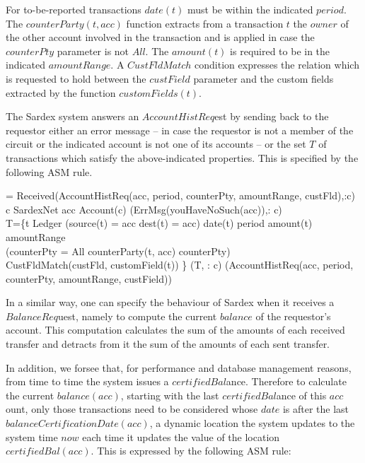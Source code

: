 For to-be-reported transactions $date(t)$ must be within the indicated $period$.  The $counterParty(t, acc)$ function extracts from a transaction $t$ the $owner$ of the other account involved in the transaction and is applied in case the $counterPty$ parameter is not $All$.  The $amount(t)$  is required to be in the indicated $amountRange$. A $CustFldMatch$ condition expresses the relation which is requested to hold between the $custField$ parameter and the custom fields extracted by the function $customFields(t)$. 



The Sardex system answers an $AccountHistReq$est by sending back to the requestor 
either an error message -- in case the requestor is not a member of the circuit or 
the indicated account is not one of its accounts -- or the set $T$ of transactions 
which satisfy the above-indicated properties. This is specified by the following ASM rule.

\begin{asm}
=\+
   \IF Received(AccountHistReq(acc, period, counterPty, amountRange, custFld),\FROM :c)    \THEN \+
     \IF c \not \in SardexNet \OR acc \not\in Account(c) \+
       \THEN {}(ErrMsg(youHaveNoSuch(acc)),\TO : c)\\
       \ELSE \+
       \LET T=\{t \in Ledger \mid (source(t) = acc \OR dest(t) = acc) \+
           \AND date(t) \in period \AND amount(t) \in amountRange \\
           \AND (\IF counterPty \not = All \THEN 
               counterParty(t, acc) \in  counterPty)\\
           \AND CustFldMatch(custFld, customField(t)) \} \IN \+
                 (T, \TO : c)\dec\dec\dec\-
     (AccountHistReq(acc, period, counterPty, amountRange, custField))
\end{asm}

In a similar way, one can specify the behaviour of Sardex when it receives a $BalanceReq$uest, namely to compute the current $balance$ of the requestor's account. This computation calculates the sum of the amounts of each received transfer and detracts from it the sum of the amounts of each sent transfer.

In addition, we forsee that, for performance and database management reasons, from time to time the system issues a $certifiedBal$ance. Therefore to calculate the current $balance(acc)$, starting with the last $certifiedBal$ance of this $acc$ount, only those transactions need to be considered whose $date$ is after the last $balanceCertificationDate(acc)$, a dynamic location the system updates to the system time $now$ each time it updates the value of the location $certifiedBal(acc)$. This is expressed by the following ASM rule:

